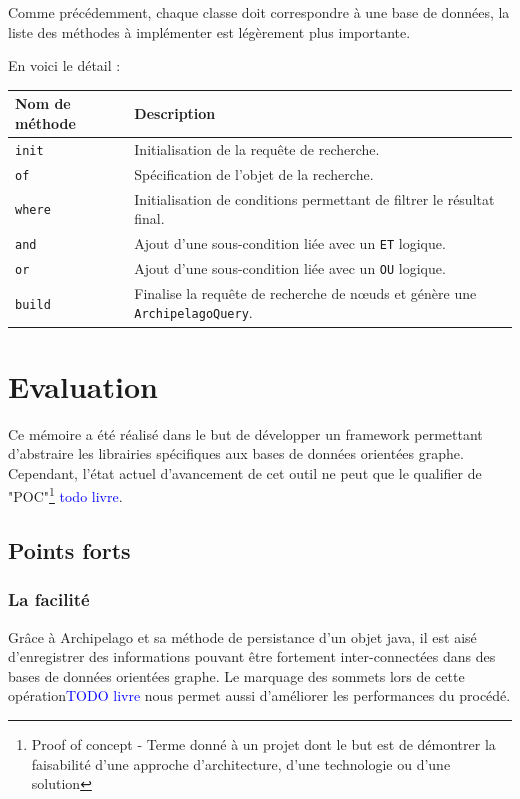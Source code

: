 \documentclass[a4paper,fleqn,12pt]{report}
\begin{document}
Comme précédemment, chaque classe doit correspondre à une base de données, la liste des méthodes à implémenter est légèrement plus importante.

En voici le détail :

\begin{tabular}[c]{|l|M{12cm}|}

\hline
\textbf{Nom de méthode} & \textbf{Description}  \tabularnewline
\hline
\texttt{init} & Initialisation de la requête de recherche.  \tabularnewline
\hline
\texttt{of} & Spécification de l'objet de la recherche.  \tabularnewline
\hline
\texttt{where} & Initialisation de conditions permettant de filtrer le résultat final.  \tabularnewline
\hline
\texttt{and} & Ajout d'une sous-condition liée avec un \texttt{ET} logique. \tabularnewline
\hline
\texttt{or} & Ajout d'une sous-condition liée avec un \texttt{OU} logique.   \tabularnewline
\hline
\texttt{build} & Finalise la requête de recherche de nœuds et génère une \texttt{ArchipelagoQuery}.   \tabularnewline \hline

\end{tabular}



\chapter{Evaluation}

Ce mémoire a été réalisé dans le but de développer un framework permettant d'abstraire les librairies spécifiques aux bases de données orientées graphe. Cependant, l'état actuel d'avancement de cet outil ne peut que le qualifier de "POC"\footnote{Proof of concept - Terme donné à un projet dont le but est de démontrer la faisabilité d'une approche d'architecture, d'une technologie ou d'une solution } \textcolor{blue}{todo livre}.


\section{Points forts}

\subsection{La facilité}

Grâce à Archipelago et sa méthode de persistance d'un objet java, il est aisé d'enregistrer des informations pouvant être fortement inter-connectées dans des bases de données orientées graphe. 
Le marquage des sommets lors de cette opération\textcolor{blue}{TODO livre} nous permet aussi d'améliorer les performances du procédé. 
\end{document}

